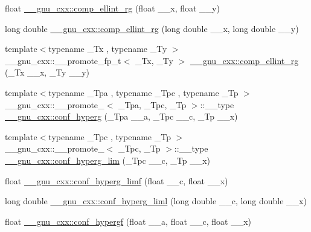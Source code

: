 \begin{DoxyCompactItemize}
\item 
float \hyperlink{group__gnu__math__spec__func_ga978f8eec6e5edc918b243925dbacb65b}{\+\_\+\+\_\+gnu\+\_\+cxx\+::comp\+\_\+ellint\+\_\+rg} (float \+\_\+\+\_\+x, float \+\_\+\+\_\+y)
\item 
long double \hyperlink{group__gnu__math__spec__func_gaca5fa8ee8125afc8f35ec6b27806e873}{\+\_\+\+\_\+gnu\+\_\+cxx\+::comp\+\_\+ellint\+\_\+rg} (long double \+\_\+\+\_\+x, long double \+\_\+\+\_\+y)
\item 
{\footnotesize template$<$typename \+\_\+\+Tx , typename \+\_\+\+Ty $>$ }\\\+\_\+\+\_\+gnu\+\_\+cxx\+::\+\_\+\+\_\+promote\+\_\+fp\+\_\+t$<$ \+\_\+\+Tx, \+\_\+\+Ty $>$ \hyperlink{group__gnu__math__spec__func_gad0ab2cfa6c4669440c47ab53cfa332ec}{\+\_\+\+\_\+gnu\+\_\+cxx\+::comp\+\_\+ellint\+\_\+rg} (\+\_\+\+Tx \+\_\+\+\_\+x, \+\_\+\+Ty \+\_\+\+\_\+y)
\item 
{\footnotesize template$<$typename \+\_\+\+Tpa , typename \+\_\+\+Tpc , typename \+\_\+\+Tp $>$ }\\\+\_\+\+\_\+gnu\+\_\+cxx\+::\+\_\+\+\_\+promote\+\_$<$ \+\_\+\+Tpa, \+\_\+\+Tpc, \+\_\+\+Tp $>$\+::\+\_\+\+\_\+type \hyperlink{group__gnu__math__spec__func_ga2e17ccbbc4cbb99c987e875531d4a3de}{\+\_\+\+\_\+gnu\+\_\+cxx\+::conf\+\_\+hyperg} (\+\_\+\+Tpa \+\_\+\+\_\+a, \+\_\+\+Tpc \+\_\+\+\_\+c, \+\_\+\+Tp \+\_\+\+\_\+x)
\item 
{\footnotesize template$<$typename \+\_\+\+Tpc , typename \+\_\+\+Tp $>$ }\\\+\_\+\+\_\+gnu\+\_\+cxx\+::\+\_\+\+\_\+promote\+\_$<$ \+\_\+\+Tpc, \+\_\+\+Tp $>$\+::\+\_\+\+\_\+type \hyperlink{group__gnu__math__spec__func_gab923b5a9e67469a5145d7bfcb20b3396}{\+\_\+\+\_\+gnu\+\_\+cxx\+::conf\+\_\+hyperg\+\_\+lim} (\+\_\+\+Tpc \+\_\+\+\_\+c, \+\_\+\+Tp \+\_\+\+\_\+x)
\item 
float \hyperlink{group__gnu__math__spec__func_ga609879a370bc4e9fc70563806bc49cb9}{\+\_\+\+\_\+gnu\+\_\+cxx\+::conf\+\_\+hyperg\+\_\+limf} (float \+\_\+\+\_\+c, float \+\_\+\+\_\+x)
\item 
long double \hyperlink{group__gnu__math__spec__func_ga367be9b77eb1f9ccc2971d5300da48d1}{\+\_\+\+\_\+gnu\+\_\+cxx\+::conf\+\_\+hyperg\+\_\+liml} (long double \+\_\+\+\_\+c, long double \+\_\+\+\_\+x)
\item 
float \hyperlink{group__gnu__math__spec__func_gabd18e600aa78c3f2b2f835039506c810}{\+\_\+\+\_\+gnu\+\_\+cxx\+::conf\+\_\+hypergf} (float \+\_\+\+\_\+a, float \+\_\+\+\_\+c, float \+\_\+\+\_\+x)
\item 

\end{DoxyCompactItemize}
